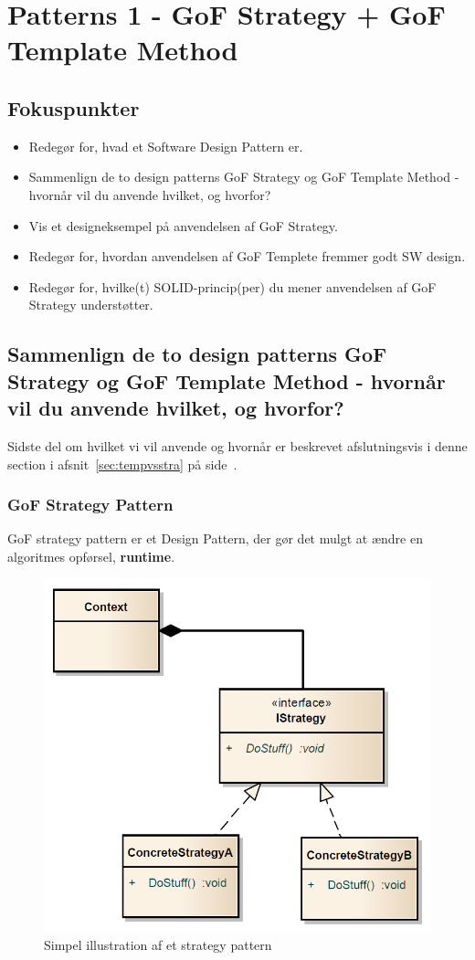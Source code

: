 \section{Patterns 1 - GoF Strategy + GoF Template Method}

\subsection{Fokuspunkter}

\begin{itemize}
	\item Redegør for, hvad et Software Design Pattern er.
	\item Sammenlign de to design patterns GoF Strategy og GoF Template Method - hvornår vil du anvende hvilket, og hvorfor?
	\item Vis et designeksempel på anvendelsen af GoF Strategy.
	\item Redegør for, hvordan anvendelsen af GoF Templete fremmer godt SW design.
	\item Redegør for, hvilke(t) SOLID-princip(per) du mener anvendelsen af GoF Strategy understøtter.
\end{itemize}



\subsection{Sammenlign de to design patterns GoF Strategy og GoF Template Method - hvornår vil du anvende hvilket, og hvorfor?}
Sidste del om hvilket vi vil anvende og hvornår er beskrevet afslutningsvis i denne section i afsnit~\ref{sec:tempvsstra} på side~\pageref{sec:tempvsstra}.

\subsubsection{GoF Strategy Pattern}
GoF strategy pattern er et Design Pattern, der gør det mulgt at ændre en algoritmes opførsel, \textbf{runtime}.

\begin{figure}[h]
	\centering
	\includegraphics[width=0.6\linewidth]{figs/strategyPattern.PNG}
	\caption[UML for et strategy pattern]{Simpel illustration af et strategy pattern}
	\label{fig:strategyPattern}
\end{figure}


